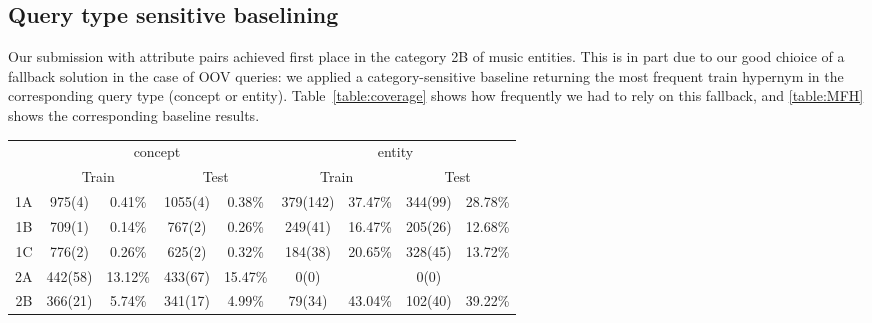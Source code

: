 \documentclass[11pt,a4paper]{article}
\begin{document}
\subsection{Query type sensitive baselining}

Our submission with attribute pairs achieved first place in the category 2B of
music entities. This is in part due to our good chioice of a fallback solution
in the case of OOV queries: we applied a category-sensitive baseline returning
the most frequent train hypernym in the corresponding query type (concept or
entity).  Table~\ref{table:coverage} shows how frequently we had to rely on
this fallback, and \autoref{table:MFH} shows the corresponding baseline
results.

\begin{table*}
	\centering
	\begin{tabular}{r|cccc|cccc}
    \toprule
		& \multicolumn{4}{c|}{concept} & \multicolumn{4}{c}{entity} \\
    & \multicolumn{2}{c}{Train} &
     \multicolumn{2}{c|}{Test} &
     \multicolumn{2}{c}{Train} &
     \multicolumn{2}{c}{Test} \\
     \midrule
1A & 975(4) & 0.41\%	&1055(4) & 0.38\%	&379(142) & 37.47\%	&344(99) & 28.78\% \\
1B & 709(1) & 0.14\%	&767(2) & 0.26\%	&249(41) & 16.47\%	&205(26) & 12.68\% \\
1C & 776(2) & 0.26\%	&625(2) & 0.32\%	&184(38) & 20.65\%	&328(45) & 13.72\% \\
2A & 442(58) & 13.12\%	&433(67) & 15.47\%	&0(0) & 	& 0(0) & \\
2B & 366(21) & 5.74\%	&341(17) & 4.99\%	&79(34) & 43.04\%	&102(40) & 39.22\% \\
\bottomrule
	\end{tabular}
  \caption{Number of in-vocabulary (and out-of-vocabulary, OOV) queries per query
  types.  The ratio of the latter is also shown.}
\label{table:coverage}
\end{table*}
\end{document}
